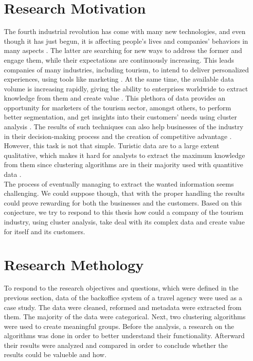 \section{Research Motivation}
The fourth industrial revolution has come with many new technologies, and even though it has just begun, it is affecting people's lives and companies' behaviors in many aspects \autocite{revolution}. The latter are searching for new ways to address the former and engage them, while their expectations are continuously increasing. This leads companies of many industries, including tourism, to intend to deliver personalized experiences, using tools like marketing \autocite{engagement}. At the same time, the available data volume is increasing rapidly, giving the ability to enterprises worldwide to extract knowledge from them and create value \autocite{bigdata}.
This plethora of data provides an opportunity for marketers of the tourism sector, amongst others, to perform better segmentation, and get insights into their customers' needs using cluster analysis \autocite{fuzzyturism}. The results of such techniques can also help businesses of the industry in their decision-making process and the creation of competitive advantage \autocite{advantage}. However, this task is not that simple. Turistic data are to a large extent qualitative, which makes it hard for analysts to extract the maximum knowledge from them since clustering algorithms are in their majority used with quantitive data \autocite{categorical}. \\
The process of eventually managing to extract the wanted information seems challenging. We could suppose though, that with the proper handling the results could prove rewarding for both the businesses and the customers. Based on this conjecture, we try to respond to this thesis how could a company of the tourism industry, using cluster analysis, take deal with its complex data and create value for itself and its customers.
\section{Research Methology}
To respond to the research objectives and questions, which were defined in the previous section, data of the backoffice system of a travel agency were used as a case study. The data were cleaned, reformed and metadata were extracted from them. The majority of the data were categorical. Next, two clustering algorithms were used to create meaningful groups. Before the analysis, a research on the algorithms was done in order to better understand their functionality. Afterward their results were analyzed and compared in order to conclude whether the results could be valueble and how.
